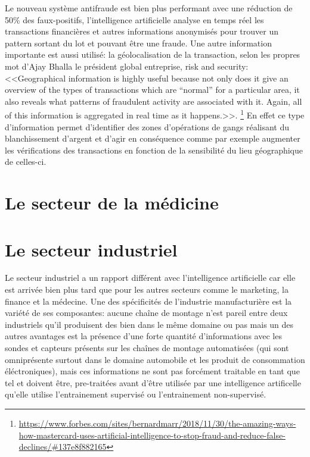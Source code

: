Le nouveau système antifraude est bien plus performant avec une réduction 
de 50\% des faux-positifs, l'intelligence artificielle analyse en temps réel 
les transactions financières et autres informations anonymisés
pour trouver un pattern sortant du lot et pouvant être une fraude. 
Une autre information importante est aussi utilisé: la géolocalisation 
de la transaction, selon les propres mot d'Ajay Bhalla le président 
global entreprise, risk and security: <<Geographical information is highly useful because 
not only does it give an overview of the types of transactions which are “normal” 
for a particular area, it also reveals what patterns of fraudulent activity 
are associated with it. Again, all of this information is aggregated in real time 
as it happens.>>.
\footnote{\url{https://www.forbes.com/sites/bernardmarr/2018/11/30/the-amazing-ways-how-mastercard-uses-artificial-intelligence-to-stop-fraud-and-reduce-false-declines/\#137e8f882165}}
En effet ce type d'information permet d'identifier des zones d'opérations de gangs réalisant du blanchissement 
d'argent et d'agir en conséquence comme par exemple augmenter les vérifications des transactions en fonction
de la sensibilité du lieu géographique de celles-ci.

\section{Le secteur de la médicine}

\section{Le secteur industriel}
Le secteur industriel a un rapport différent avec l'intelligence artificielle car elle est arrivée 
bien plus tard que pour les autres secteurs comme le marketing, la finance et la médecine.
Une des spécificités de l'industrie manufacturière est la variété de ses composantes: 
aucune chaîne de montage n'est pareil entre deux industriels qu'il produisent des bien 
dans le même domaine ou pas mais un des autres avantages est la présence d'une forte quantité 
d'informations avec les sondes et capteurs présents sur les chaînes de montage automatisées 
(qui sont omniprésente surtout dans le domaine automobile et les produit de consommation éléctroniques), 
mais ces informations ne sont pas forcément traitable en tant que tel et doivent être, pre-traitées
avant d'être utilisée par une intelligence artificelle qu'elle utilise l'entrainement 
supervisé ou l'entrainement non-supervisé. \newline


